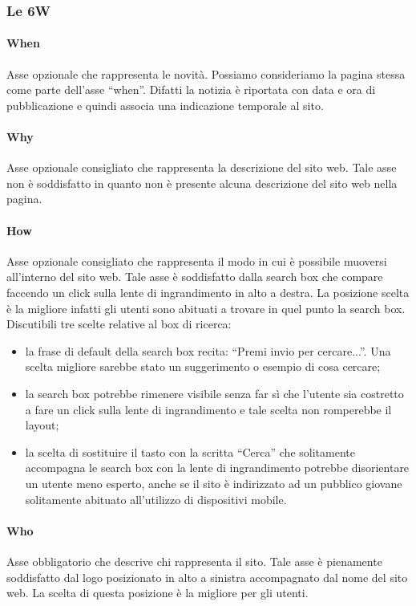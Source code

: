 \documentclass[../ProgettoTecWeb2.tex]{subfiles}
\begin{document}
		\subsubsection{Le 6W}
			\paragraph{When}
			Asse opzionale che rappresenta le novità. Possiamo consideriamo la pagina stessa come parte dell'asse ``when''. Difatti la notizia è riportata con data e ora di pubblicazione e quindi associa una indicazione temporale al sito.

			\paragraph{Why}
			Asse opzionale consigliato che rappresenta la descrizione del sito web. Tale asse non è soddisfatto in quanto non è presente alcuna descrizione del sito web nella pagina.

			\paragraph{How}
			Asse opzionale consigliato che rappresenta il modo in cui è possibile muoversi all'interno del sito web. Tale asse è soddisfatto dalla search box che compare faccendo un click sulla lente di ingrandimento in alto a destra. La posizione scelta è la migliore infatti gli utenti sono abituati a trovare in quel punto la search box. Discutibili tre scelte relative al box di ricerca:
			\begin{itemize}
				\item la frase di default della search box recita: ``Premi invio per cercare...''. Una scelta migliore sarebbe stato un suggerimento o esempio di cosa cercare;
				\item la search box potrebbe rimenere visibile senza far sì che l'utente sia costretto a fare un click sulla lente di ingrandimento e tale scelta non romperebbe il layout;
				\item la scelta di sostituire il tasto con la scritta ``Cerca'' che solitamente accompagna le search box con la lente di ingrandimento potrebbe disorientare un utente meno esperto, anche se il sito è indirizzato ad un pubblico giovane solitamente abituato all'utilizzo di dispositivi mobile.
			\end{itemize}

			\paragraph{Who}
			Asse obbligatorio che descrive chi rappresenta il sito. Tale asse è pienamente soddisfatto dal logo posizionato in alto a sinistra accompagnato dal nome del sito web. La scelta di questa posizione è la migliore per gli utenti.
\end{document}
